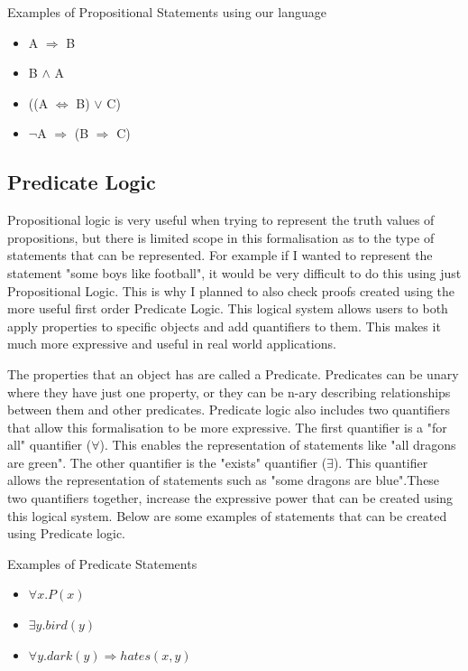 \pagebreak
\begin{exmp}Examples of Propositional Statements using our language
\begin{itemize}
\item A $\Rightarrow$ B
\item B $\wedge$ A
\item ((A $\Leftrightarrow$ B) $\vee$ C)
\item $\neg$A $\Rightarrow$ (B $\Rightarrow$ C)
\end{itemize}
\end{exmp}


\subsection{Predicate Logic \label{predicate}}
Propositional logic is very useful when trying to represent the truth values of propositions, but there is limited scope in this formalisation as to the type of statements that can be represented. For example if I wanted to represent the statement "some boys like football", it would be very difficult to do this using just Propositional Logic. This is why I planned to also check proofs created using the more useful first order Predicate Logic. This logical system allows users to both apply properties to specific objects and add quantifiers to them. This makes it much more expressive and useful in real world applications. 

The properties that an object has are called a Predicate. Predicates can be unary where they have just one property, or they can be n-ary describing relationships between them and other predicates. Predicate logic also includes two quantifiers that allow this formalisation to be more expressive. The first quantifier is a "for all" quantifier ($\forall$). This enables the representation of statements like "all dragons are green". The other quantifier is the "exists" quantifier ($\exists$). This quantifier allows the representation of statements such as "some dragons are blue".These two quantifiers together, increase the expressive power that can be created using this logical system. Below are some examples of statements that can be created using Predicate logic.

\begin{exmp}Examples of Predicate Statements
\begin{itemize}
\item $\forall x.P(x)$
\item $\exists y.bird(y)$
\item $\forall y.dark(y) \Rightarrow hates(x,y)$
\end{itemize}
\end{exmp}

